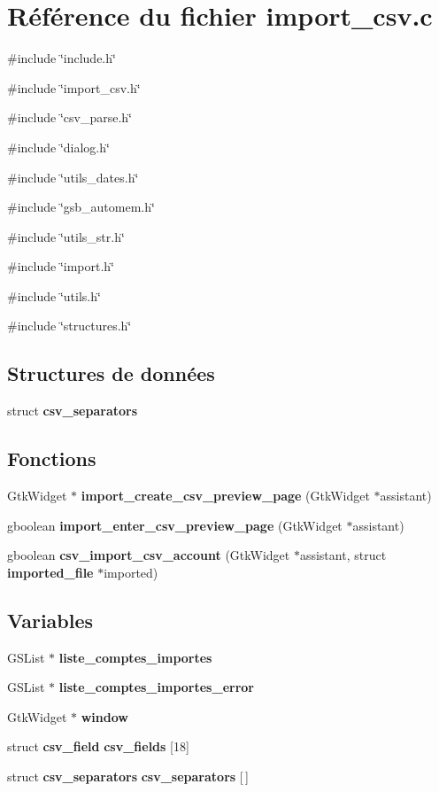 \section{Référence du fichier import\_\-csv.c}
\label{import__csv_8c}
{\ttfamily \#include \char`\"{}include.h\char`\"{}}\par
{\ttfamily \#include \char`\"{}import\_\-csv.h\char`\"{}}\par
{\ttfamily \#include \char`\"{}csv\_\-parse.h\char`\"{}}\par
{\ttfamily \#include \char`\"{}dialog.h\char`\"{}}\par
{\ttfamily \#include \char`\"{}utils\_\-dates.h\char`\"{}}\par
{\ttfamily \#include \char`\"{}gsb\_\-automem.h\char`\"{}}\par
{\ttfamily \#include \char`\"{}utils\_\-str.h\char`\"{}}\par
{\ttfamily \#include \char`\"{}import.h\char`\"{}}\par
{\ttfamily \#include \char`\"{}utils.h\char`\"{}}\par
{\ttfamily \#include \char`\"{}structures.h\char`\"{}}\par
\subsection*{Structures de données}
\begin{DoxyCompactItemize}
\item 
struct {\bf csv\_\-separators}
\end{DoxyCompactItemize}
\subsection*{Fonctions}
\begin{DoxyCompactItemize}
\item 
GtkWidget $\ast$ {\bf import\_\-create\_\-csv\_\-preview\_\-page} (GtkWidget $\ast$assistant)
\item 
gboolean {\bf import\_\-enter\_\-csv\_\-preview\_\-page} (GtkWidget $\ast$assistant)
\item 
gboolean {\bf csv\_\-import\_\-csv\_\-account} (GtkWidget $\ast$assistant, struct {\bf imported\_\-file} $\ast$imported)
\end{DoxyCompactItemize}
\subsection*{Variables}
\begin{DoxyCompactItemize}
\item 
GSList $\ast$ {\bf liste\_\-comptes\_\-importes}
\item 
GSList $\ast$ {\bf liste\_\-comptes\_\-importes\_\-error}
\item 
GtkWidget $\ast$ {\bf window}
\item 
struct {\bf csv\_\-field} {\bf csv\_\-fields} [18]
\item 
struct {\bf csv\_\-separators} {\bf csv\_\-separators} [$\,$]
\end{DoxyCompactItemize}


